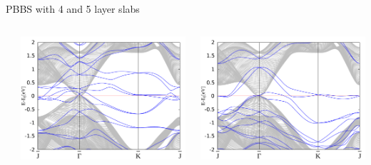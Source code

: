 \begin{frame}{PBBS with 4 and 5 layer slabs}
\begin{columns}
\begin{column}{.34\linewidth}
		\end{column}
		\begin{column}{.34\linewidth}
			\centering
			\includegraphics[width=\linewidth]{Te_termination/bulk+5_layers_no_dos_-2_2.pdf}
		\end{column}
		\begin{column}{.34\linewidth}
			\centering
			\includegraphics[width=\linewidth]{Hg_termination/bulk+5_layers_no_dos_-2_2.pdf}
		\end{column}
	\end{columns}

\end{frame}
